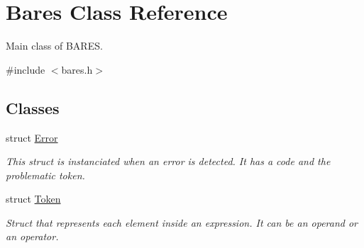 \hypertarget{classBares}{}\section{Bares Class Reference}
\label{classBares}


Main class of B\+A\+R\+ES.  




{\ttfamily \#include $<$bares.\+h$>$}

\subsection*{Classes}
\begin{DoxyCompactItemize}
\item 
struct \hyperlink{structBares_1_1Error}{Error}
\begin{DoxyCompactList}\small\item\em This struct is instanciated when an error is detected. It has a code and the problematic token. \end{DoxyCompactList}\item 
struct \hyperlink{structBares_1_1Token}{Token}
\begin{DoxyCompactList}\small\item\em Struct that represents each element inside an expression. It can be an operand or an operator. \end{DoxyCompactList}\end{DoxyCompactItemize}

